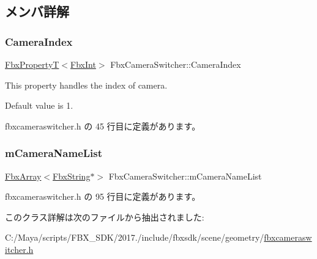 \subsection{メンバ詳解}
\mbox{\label{class_fbx_camera_switcher_a9128f6b644b222070f2e34e69874a41d}} 
\subsubsection{\texorpdfstring{Camera\+Index}{CameraIndex}}
{\footnotesize\ttfamily \hyperlink{class_fbx_property_t}{Fbx\+PropertyT}$<$\hyperlink{fbxtypes_8h_a088fa96de3b0b3ea69f0f6afef525dfb}{Fbx\+Int}$>$ Fbx\+Camera\+Switcher\+::\+Camera\+Index}

This property handles the index of camera.

Default value is 1. 

 fbxcameraswitcher.\+h の 45 行目に定義があります。

\mbox{\label{class_fbx_camera_switcher_a03c2a77943c839af5cec42d8566724a9}} 
\subsubsection{\texorpdfstring{m\+Camera\+Name\+List}{mCameraNameList}}
{\footnotesize\ttfamily \hyperlink{class_fbx_array}{Fbx\+Array}$<$\hyperlink{class_fbx_string}{Fbx\+String}$\ast$$>$ Fbx\+Camera\+Switcher\+::m\+Camera\+Name\+List\hspace{0.3cm}{\ttfamily [protected]}}



 fbxcameraswitcher.\+h の 95 行目に定義があります。



このクラス詳解は次のファイルから抽出されました\+:\begin{DoxyCompactItemize}
\item 
C\+:/\+Maya/scripts/\+F\+B\+X\+\_\+\+S\+D\+K/2017./include/fbxsdk/scene/geometry/\hyperlink{fbxcameraswitcher_8h}{fbxcameraswitcher.\+h}\end{DoxyCompactItemize}
